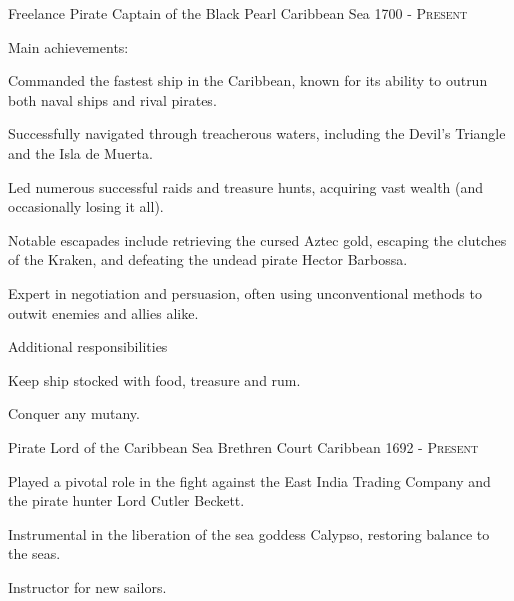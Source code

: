 


\begin{cventries}


\cventry
{Freelance Pirate} %
{Captain of the Black Pearl} %
{Caribbean Sea} %
{1700 - \textsc{Present}} %
{
\begin{cvitems}
\setlength{\itemsep}{1ex} %
% 
\item Main achievements:
\begin{cvitemsnested}
    \item{Commanded the fastest ship in the Caribbean, known for its ability to outrun both naval ships and rival pirates.}
    \item{Successfully navigated through treacherous waters, including the Devil's Triangle and the Isla de Muerta.}
    \item{Led numerous successful raids and treasure hunts, acquiring vast wealth (and occasionally losing it all).}
    \item{Notable escapades include retrieving the cursed Aztec gold, escaping the clutches of the Kraken, and defeating the undead pirate Hector Barbossa.}
    \item{Expert in negotiation and persuasion, often using unconventional methods to outwit enemies and allies alike.}
\end{cvitemsnested}
\item {Additional responsibilities}
    \begin{cvitemsnested}
    \item {Keep ship stocked with food, treasure and rum.}
    \item {Conquer any mutany.}
    \end{cvitemsnested}
\end{cvitems}
}

\cventry
{Pirate Lord of the Caribbean Sea} %
{Brethren Court} %
{Caribbean } %
{1692 - \textsc{Present}} %
{
\begin{cvitems}
\setlength{\itemsep}{1ex} %
%
\item {Played a pivotal role in the fight against the East India Trading Company and the pirate hunter Lord Cutler Beckett. \hfill {}}
\item {Instrumental in the liberation of the sea goddess Calypso, restoring balance to the seas. \hfill {}}
\item {Instructor for new sailors.}
\end{cvitems}
}


\end{cventries}
